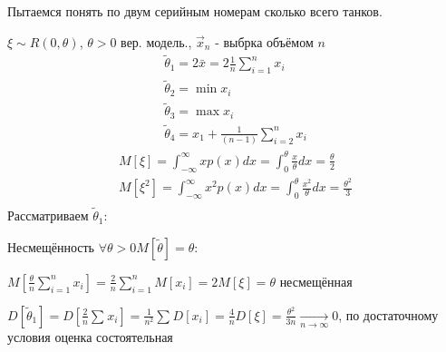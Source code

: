 \documentclass{article}
\begin{document}
\hr
\begin{problem}[Т1] Пытаемся понять по двум серийным номерам сколько всего танков.

  $\xi\sim R(0,\theta)$, $\theta >0$ вер. модель., $\vec{x}_n$ - выбрка объёмом $n$
  \begin{gather*}
    \tilde{\theta}_1=2\bar{x}=2\frac{1}{n}\sum_{i=1}^{n}x_i \\
    \tilde{\theta}_2= \min x_i \\
    \tilde{\theta}_3= \max x_i \\
    \tilde{\theta}_4= x_1 + \frac{1}{(n-1)}\sum_{i=2}^{n}x_i
  \end{gather*}
  \begin{gather*}
    M[\xi]=\int_{-\infty}^{\infty}xp(x)dx=\int_{0}^{\theta}\frac{x}{\theta}dx=\frac{\theta}{2} \\
    M[\xi^{2}]=\int_{-\infty}^{\infty}x^{2}p(x)dx=\int_{0}^{\theta}\frac{x^2}{\theta}dx=\frac{\theta^{2}}{3} \\
  \end{gather*}
  Рассматриваем $\tilde{\theta}_1$:

  Несмещённость $\forall \theta >0 M[\tilde\theta]=\theta$:

  $M[\frac{\theta}{n}\sum_{i=1}^{n}x_i]=\frac{2}{n}\sum_{i=1}^{n}M[x_i]=2M[\xi]=\theta$ несмещённая

  $D[\tilde\theta_1]=D[\frac{2}{n}\sum_{}^{}x_i]=\frac{1}{n^{2}}\sum_{}^{}D[x_i]=
  \frac{4}{n}D[\xi]=\frac{\theta^{2}}{3n}\underset{n\to\infty}{\to}0$,
  по достаточному условия оценка состоятельная


\end{problem}
\end{document}
